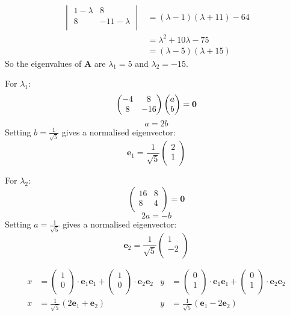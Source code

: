 \documentclass[10pt,oneside,a4paper]{article}
\begin{document}
\begin{enumerate}
\[
\begin{split}
\begin{vmatrix}
1 - \lambda & 8 \\
8 & -11 - \lambda \\
\end{vmatrix}
&=
(\lambda - 1)(\lambda + 11) - 64 \\
&= \lambda^2 + 10\lambda - 75 \\
&= (\lambda - 5)(\lambda + 15)
\end{split}
\]
So the eigenvalues of $\mathbf{A}$ are $\lambda_1 = 5$ and $\lambda_2 = -15$.

For $\lambda_1$:
\[
\begin{pmatrix}
-4 & 8 \\
8 & -16 \\
\end{pmatrix}
\begin{pmatrix}
a \\ b \\
\end{pmatrix}
=
\mathbf{0} \\
\]
\[
a = 2b
\]
Setting $b = \frac{1}{\sqrt {5}}$ gives a normalised eigenvector:
\[
\mathbf{e}_1 =
\frac{1}{\sqrt {5}}
\begin{pmatrix}
2 \\ 1 \\
\end{pmatrix}
\]

For $\lambda_2$:
\[
\begin{pmatrix}
16 & 8 \\
8 & 4 \\
\end{pmatrix}
=
\mathbf{0}
\]
\[
2a = -b
\]
Setting $a = \frac{1}{\sqrt {5}}$ gives a normalised eigenvector:
\[
\mathbf{e}_2 =
\frac{1}{\sqrt {5}}
\begin{pmatrix}
1 \\ -2 \\
\end{pmatrix}
\]

\begin{align*}
x &= \begin{pmatrix}
1 \\ 0 \\
\end{pmatrix}\cdot \mathbf{e}_1 \mathbf{e}_1 +
\begin{pmatrix}
1 \\ 0 \\
\end{pmatrix}\cdot \mathbf{e}_2 \mathbf{e}_2
&
y &= \begin{pmatrix}
0 \\ 1 \\
\end{pmatrix}\cdot \mathbf{e}_1 \mathbf{e}_1 +
\begin{pmatrix}
0 \\ 1 \\
\end{pmatrix}\cdot \mathbf{e}_2 \mathbf{e}_2 \\
x &= \frac{1}{\sqrt {5}}(2\mathbf{e}_1 + \mathbf{e}_2) & y &= \frac{1}{\sqrt {5}}(\mathbf{e}_1 - 2\mathbf{e}_2)
\end{align*}


\end{enumerate}
\end{document}
